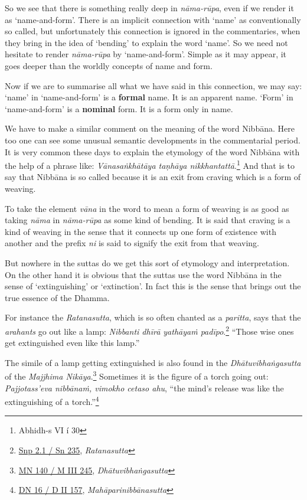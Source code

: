 So we see that there is something really deep in \emph{nāma-rūpa}, even if we render it as `name-and-form'. There is an implicit connection with `name' as conventionally so called, but unfortunately this connection is ignored in the commentaries, when they bring in the idea of `bending' to explain the word `name'. So we need not hesitate to render \emph{nāma-rūpa} by `name-and-form'. Simple as it may appear, it goes deeper than the worldly concepts of name and form.

Now if we are to summarise all what we have said in this connection, we may say: `name' in `name-and-form' is a \textbf{formal} name. It is an apparent name. `Form' in `name-and-form' is a \textbf{nominal} form. It is a form only in name.

We have to make a similar comment on the meaning of the word Nibbāna. Here too one can see some unusual semantic developments in the commentarial period. It is very common these days to explain the etymology of the word Nibbāna with the help of a phrase like: \emph{Vānasaṅkhātāya taṇhāya nikkhantattā}.\footnote{Abhidh-s VI í 30} And that is to say that Nibbāna is so called because it is an exit from craving which is a form of weaving.

To take the element \emph{vāna} in the word to mean a form of weaving is as good as taking \emph{nāma} in \emph{nāma-rūpa} as some kind of bending. It is said that craving is a kind of weaving in the sense that it connects up one form of existence with another and the prefix \emph{ni} is said to signify the exit from that weaving.

But nowhere in the suttas do we get this sort of etymology and interpretation. On the other hand it is obvious that the suttas use the word Nibbāna in the sense of `extinguishing' or `extinction'. In fact this is the sense that brings out the true essence of the Dhamma.

For instance the \emph{Ratanasutta}, which is so often chanted as a \emph{paritta}, says that the \emph{arahants} go out like a lamp: \emph{Nibbanti dhīrā yathāyaṁ padīpo}.\footnote{\href{https://suttacentral.net/snp2.1/pli/ms}{Snp 2.1 / Sn 235}, \emph{Ratanasutta}} ``Those wise ones get extinguished even like this lamp.''

The simile of a lamp getting extinguished is also found in the \emph{Dhātuvibhaṅgasutta} of the \emph{Majjhima Nikāya}.\footnote{\href{https://suttacentral.net/mn140/pli/ms}{MN 140 / M III 245}, \emph{Dhātuvibhaṅgasutta}} Sometimes it is the figure of a torch going out: \emph{Pajjotass'eva nibbānaṁ, vimokho cetaso ahu}, ``the mind's release was like the extinguishing of a torch.''\footnote{\href{https://suttacentral.net/dn16/pli/ms}{DN 16 / D II 157}, \emph{Mahāparinibbānasutta}}

